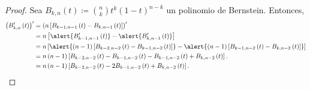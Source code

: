 \begin{frame}
    \begin{proof}
        Sea
        \begin{math}
            B_{k,n}\left(t\right)\coloneqq
            \binom{n}{k}
            t^{k}
            \left(1-t\right)^{n-k}
        \end{math}
        un polinomio de Bernstein.
        Entonces,
        \begin{align*}
            {\left(
                B^{\prime}_{k,n}\left(t\right)
                \right)}^{\prime}
             & =
            \left(
            n
            \left[
                B_{k-1,n-1}\left(t\right)-
                B_{k,n-1}\left(t\right)
                \right]
            \right)^{\prime} \\
             & =
            n\left[
                \alert{
                    B^{\prime}_{k-1,n-1}\left(t\right)
                }    -
                \alert{
                    B^{\prime}_{k,n-1}\left(t\right)
                }
            \right]          \\
             & =
            n\left[
                \alert{
                    \left(n-1\right)
                    \left[
                        B_{k-2,n-2}\left(t\right)-
                        B_{k-1,n-2}\left(t\right)
                        \right]
                }    -
                \alert{
                    \left(n-1\right)
                    \left[
                        B_{k-1,n-2}\left(t\right)-
                        B_{k,n-2}\left(t\right)
                        \right]
                }
            \right]          \\
             & =
            n\left(n-1\right)
            \left[
                B_{k-2,n-2}\left(t\right)-
                B_{k-1,n-2}\left(t\right)-
                B_{k-1,n-2}\left(t\right)+
                B_{k,n-2}\left(t\right)
            \right].         \\
             & =
            n\left(n-1\right)
            \left[
                B_{k-2,n-2}\left(t\right)-
                2B_{k-1,n-2}\left(t\right)+
                B_{k,n-2}\left(t\right)
                \right].
        \end{align*}
    \end{proof}
\end{frame}